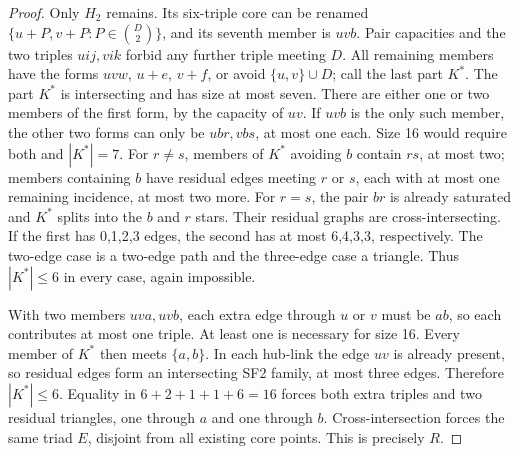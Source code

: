 \documentclass[11pt,a4paper]{article}
\numberwithin{equation}{section}
\theoremstyle{remark}
\begin{document}
\begin{proof}
Only $ H_2$ remains. Its six-triple core can be renamed
$\{u+P,v+P:P\in\binom D2\}$, and its seventh member is $ uvb $.
Pair capacities and the two triples $ uij,vik $ forbid any further triple
meeting $ D $. All remaining members have the forms $ uvw $, $ u+e $, $ v+f $,
or avoid $\{u,v\}\cup D $; call the last part $ K^*$. The part $ K^*$ is
intersecting and has size at most seven. There are either one or two
members of the first form, by the capacity of $ uv $.
If $ uvb $ is the only such member, the other two forms can only be
$ ubr,vbs $, at most one each. Size 16 would require both and $|K^*|=7$.
For $ r\ne s $, members of $ K^*$ avoiding $ b $ contain $ rs $, at most two;
members containing $ b $ have residual edges meeting $ r $ or $ s $, each
with at most one remaining incidence, at most two more. For $ r=s $,
the pair $ br $ is already saturated and $ K^*$ splits into the $ b $ and
$ r $ stars. Their residual graphs are cross-intersecting. If the first
has 0,1,2,3 edges, the second has at most 6,4,3,3, respectively. The
two-edge case is a two-edge path and the three-edge case a triangle.
Thus $|K^*|\le 6$ in every case, again impossible.

With two members $ uva,uvb $, each extra edge through $ u $ or $ v $ must be
$ ab $, so each contributes at most one triple. At least one is necessary
for size 16. Every member of $ K^*$ then meets $\{a,b\}$. In each hub-link
the edge $ uv $ is already present, so residual edges form an intersecting
SF2 family, at most three edges. Therefore $|K^*|\le 6$. Equality in
$6+2+1+1+6=16$ forces both extra triples and two residual triangles,
one through $ a $ and one through $ b $. Cross-intersection forces the same
triad $ E $, disjoint from all existing core points. This is precisely $ R $.
\end{proof}
\end{document}

